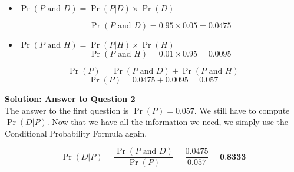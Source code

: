 \documentclass[]{article}
\begin{document}
	\begin{itemize}
		\item $\Pr(P \mbox{ and } D) = \Pr(P|D) \times \Pr(D)$
		
		\[\Pr(P \mbox{ and } D) = 0.95 \times 0.05 = 0.0475\]
		
		\item $\Pr(P \mbox{ and } H) = \Pr(P|H) \times \Pr(H)$
		\[\Pr(P \mbox{ and } H) = 0.01 \times 0.95 = 0.0095\]
	\end{itemize}
	{
		\large
		\[\Pr(P)  =  \Pr(P \mbox{ and } D)  +  \Pr(P \mbox{ and } H)\]
		\[\Pr(P)  =  0.0475  +  0.0095 =  \boldsymbol{0.057}\]
	}
	\bigskip
	
	\noindent \textbf{Solution: Answer to Question 2}\\
	\noindent The answer to the first question is $\Pr(P) =  0.057$. We still have to compute $\Pr(D|P)$. Now that we have all the information we need, we simply use the Conditional Probability Formula again.
	{
		\large
		\[\Pr(D|P) = \frac{\Pr(P \mbox{ and } D)}{\Pr(P)} = \frac{0.0475}{0.057} = \textbf{0.8333}\]
		
	}
	
	
\end{document}
